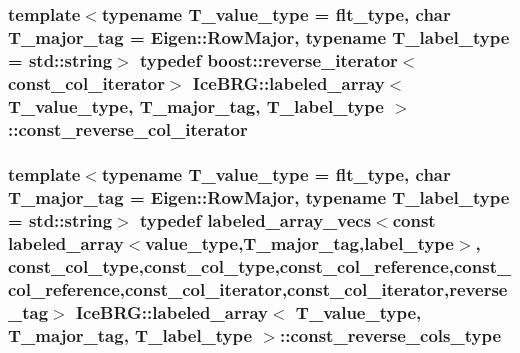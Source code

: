 \subsubsection[{const\+\_\+reverse\+\_\+col\+\_\+iterator}]{\setlength{\rightskip}{0pt plus 5cm}template$<$typename T\+\_\+value\+\_\+type = flt\+\_\+type, char T\+\_\+major\+\_\+tag = Eigen\+::\+Row\+Major, typename T\+\_\+label\+\_\+type = std\+::string$>$ typedef boost\+::reverse\+\_\+iterator$<${\bf const\+\_\+col\+\_\+iterator}$>$ {\bf Ice\+B\+R\+G\+::labeled\+\_\+array}$<$ T\+\_\+value\+\_\+type, T\+\_\+major\+\_\+tag, T\+\_\+label\+\_\+type $>$\+::{\bf const\+\_\+reverse\+\_\+col\+\_\+iterator}}\label{classIceBRG_1_1labeled__array_a7b4b912b75ec933905708199ea2f639d}
\hypertarget{classIceBRG_1_1labeled__array_ac510eb93a7d0a73793dc7b381e8684ff}{}
\subsubsection[{const\+\_\+reverse\+\_\+cols\+\_\+type}]{\setlength{\rightskip}{0pt plus 5cm}template$<$typename T\+\_\+value\+\_\+type = flt\+\_\+type, char T\+\_\+major\+\_\+tag = Eigen\+::\+Row\+Major, typename T\+\_\+label\+\_\+type = std\+::string$>$ typedef {\bf labeled\+\_\+array\+\_\+vecs}$<$const {\bf labeled\+\_\+array}$<${\bf value\+\_\+type},T\+\_\+major\+\_\+tag,{\bf label\+\_\+type}$>$, {\bf const\+\_\+col\+\_\+type},{\bf const\+\_\+col\+\_\+type},{\bf const\+\_\+col\+\_\+reference},{\bf const\+\_\+col\+\_\+reference},{\bf const\+\_\+col\+\_\+iterator},{\bf const\+\_\+col\+\_\+iterator},{\bf reverse\+\_\+tag}$>$ {\bf Ice\+B\+R\+G\+::labeled\+\_\+array}$<$ T\+\_\+value\+\_\+type, T\+\_\+major\+\_\+tag, T\+\_\+label\+\_\+type $>$\+::{\bf const\+\_\+reverse\+\_\+cols\+\_\+type}}\label{classIceBRG_1_1labeled__array_ac510eb93a7d0a73793dc7b381e8684ff}
\hypertarget{classIceBRG_1_1labeled__array_a5088e7c1e054a6f2d6067664ee29fafb}{}
